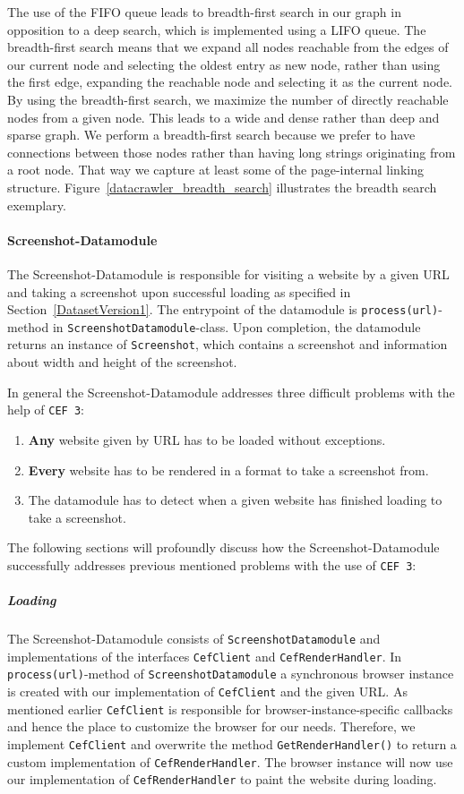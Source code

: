 The use of the FIFO queue leads to breadth-first search in our graph in opposition to a deep search, which is implemented using a LIFO queue. The breadth-first search means that we expand all nodes reachable from the edges of our current node and selecting the oldest entry as new node, rather than using the first edge, expanding the reachable node and selecting it as the current node. By using the breadth-first search, we maximize the number of directly reachable nodes from a given node. This leads to a wide and dense rather than deep and sparse graph. We perform a breadth-first search because we prefer to have connections between those nodes rather than having long strings originating from a root node. That way we capture at least some of the page-internal linking structure. Figure~\ref{datacrawler_breadth_search} illustrates the breadth search exemplary.

\paragraph*{Screenshot-Datamodule}
\label{datacrawler_screenshot_datamodule}
The Screenshot-Datamodule is responsible for visiting a website by a given URL and taking a screenshot upon successful loading as specified in Section~\ref{DatasetVersion1}. The entrypoint of the datamodule is \texttt{process(url)}-method in \texttt{ScreenshotDatamodule}-class. Upon completion, the datamodule returns an instance of \texttt{Screenshot}, which contains a screenshot and information about width and height of the screenshot.

In general the Screenshot-Datamodule addresses three difficult problems with the help of \texttt{CEF 3}: 

\begin{enumerate}
	\item \textbf{Any} website given by URL  has to be loaded without exceptions.
	\item \textbf{Every} website has to be rendered in a format to take a screenshot from.
	\item The datamodule has to detect when a given website has finished loading to take a screenshot.
\end{enumerate}

The following sections will profoundly discuss how the Screenshot-Datamodule successfully addresses previous mentioned problems with the use of \texttt{CEF 3}:

\subparagraph*{Loading} 
The Screenshot-Datamodule consists of \texttt{ScreenshotDatamodule} and implementations of the interfaces \texttt{CefClient} and \texttt{CefRenderHandler}. In \texttt{process(url)}-method of \texttt{ScreenshotDatamodule} a synchronous browser instance is created with our implementation of \texttt{CefClient} and the given URL. As mentioned earlier \texttt{CefClient} is responsible for browser-instance-specific callbacks and hence the place to customize the browser for our needs. Therefore, we implement \texttt{CefClient} and overwrite the method \texttt{GetRenderHandler()} to return a custom implementation of \texttt{CefRenderHandler}. The browser instance will now use our implementation of \texttt{CefRenderHandler} to paint the website during loading.

